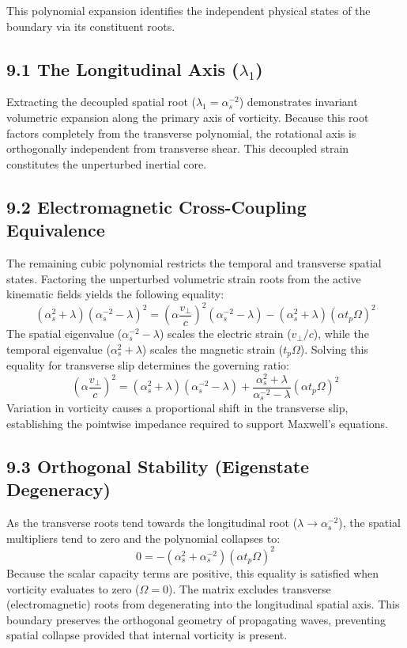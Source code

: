 This polynomial expansion identifies the independent physical states of the boundary via its constituent roots. 

\vspace{0.2cm} 

\subsection*{9.1 The Longitudinal Axis ($\lambda_1$)} 
Extracting the decoupled spatial root ($\lambda_1 = \alpha_s^{-2}$) demonstrates invariant volumetric expansion along the primary axis of vorticity. Because this root factors completely from the transverse polynomial, the rotational axis is orthogonally independent from transverse shear. This decoupled strain constitutes the unperturbed inertial core. 

\subsection*{9.2 Electromagnetic Cross-Coupling Equivalence} 
The remaining cubic polynomial restricts the temporal and transverse spatial states. Factoring the unperturbed volumetric strain roots from the active kinematic fields yields the following equality: 
\begin{equation} 
    (\alpha_s^2 + \lambda) (\alpha_s^{-2} - \lambda)^2 = \left(\alpha \frac{v_\perp}{c}\right)^2 (\alpha_s^{-2} - \lambda) - (\alpha_s^2 + \lambda)(\alpha t_p \Omega)^2 
\end{equation} 
The spatial eigenvalue ($\alpha_s^{-2} - \lambda$) scales the electric strain ($v_\perp / c$), while the temporal eigenvalue ($\alpha_s^2 + \lambda$) scales the magnetic strain ($t_p \Omega$). Solving this equality for transverse slip determines the governing ratio: 
\begin{equation}
    \left(\alpha \frac{v_\perp}{c}\right)^2 = (\alpha_s^2 + \lambda)(\alpha_s^{-2} - \lambda) + \frac{\alpha_s^2 + \lambda}{\alpha_s^{-2} - \lambda} (\alpha t_p \Omega)^2 
\end{equation} 
Variation in vorticity causes a proportional shift in the transverse slip, establishing the pointwise impedance required to support Maxwell's equations. 

\subsection*{9.3 Orthogonal Stability (Eigenstate Degeneracy)} %
As the transverse roots tend towards the longitudinal root ($\lambda \to \alpha_s^{-2}$), the spatial multipliers tend to zero and the polynomial collapses to: 
\begin{equation} 
    0 = - (\alpha_s^2 + \alpha_s^{-2})(\alpha t_p \Omega)^2 
\end{equation}
Because the scalar capacity terms are positive, this equality is satisfied when vorticity evaluates to zero ($\Omega = 0$). The matrix excludes transverse (electromagnetic) roots from degenerating into the longitudinal spatial axis. This boundary preserves the orthogonal geometry of propagating waves, preventing spatial collapse provided that internal vorticity is present. 

